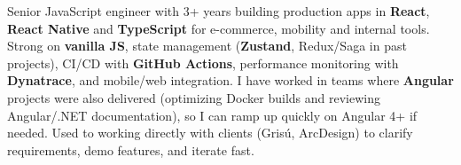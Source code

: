 
\begin{cvparagraph}
Senior JavaScript engineer with 3+ years building production apps in \textbf{React}, \textbf{React Native} and \textbf{TypeScript} for e-commerce, mobility and internal tools. Strong on \textbf{vanilla JS}, state management (\textbf{Zustand}, Redux/Saga in past projects), CI/CD with \textbf{GitHub Actions}, performance monitoring with \textbf{Dynatrace}, and mobile/web integration. I have worked in teams where \textbf{Angular} projects were also delivered (optimizing Docker builds and reviewing Angular/.NET documentation), so I can ramp up quickly on Angular 4+ if needed. Used to working directly with clients (Grisú, ArcDesign) to clarify requirements, demo features, and iterate fast.
\end{cvparagraph}
